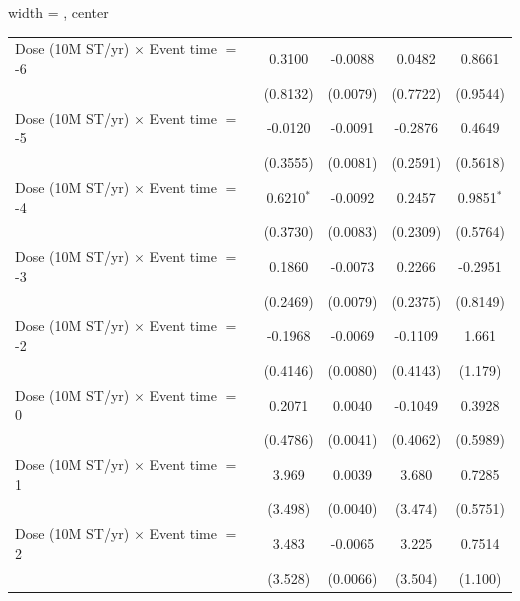 \begin{table}[htbp]
\begin{adjustbox}{width = \textwidth, center}
\begin{tabular}{lcccc}
         \midrule 
         Dose (10M ST/yr) $\times$ Event time $=$ -6  & 0.3100             & -0.0088            & 0.0482        & 0.8661\\   
                                                      & (0.8132)           & (0.0079)           & (0.7722)      & (0.9544)\\   
         Dose (10M ST/yr) $\times$ Event time $=$ -5  & -0.0120            & -0.0091            & -0.2876       & 0.4649\\   
                                                      & (0.3555)           & (0.0081)           & (0.2591)      & (0.5618)\\   
         Dose (10M ST/yr) $\times$ Event time $=$ -4  & 0.6210$^{*}$       & -0.0092            & 0.2457        & 0.9851$^{*}$\\   
                                                      & (0.3730)           & (0.0083)           & (0.2309)      & (0.5764)\\   
         Dose (10M ST/yr) $\times$ Event time $=$ -3  & 0.1860             & -0.0073            & 0.2266        & -0.2951\\   
                                                      & (0.2469)           & (0.0079)           & (0.2375)      & (0.8149)\\   
         Dose (10M ST/yr) $\times$ Event time $=$ -2  & -0.1968            & -0.0069            & -0.1109       & 1.661\\   
                                                      & (0.4146)           & (0.0080)           & (0.4143)      & (1.179)\\   
         Dose (10M ST/yr) $\times$ Event time $=$ 0   & 0.2071             & 0.0040             & -0.1049       & 0.3928\\   
                                                      & (0.4786)           & (0.0041)           & (0.4062)      & (0.5989)\\   
         Dose (10M ST/yr) $\times$ Event time $=$ 1   & 3.969              & 0.0039             & 3.680         & 0.7285\\   
                                                      & (3.498)            & (0.0040)           & (3.474)       & (0.5751)\\   
         Dose (10M ST/yr) $\times$ Event time $=$ 2   & 3.483              & -0.0065            & 3.225         & 0.7514\\   
                                                      & (3.528)            & (0.0066)           & (3.504)       & (1.100)\\   

\end{tabular}
\end{adjustbox}
\end{table}
